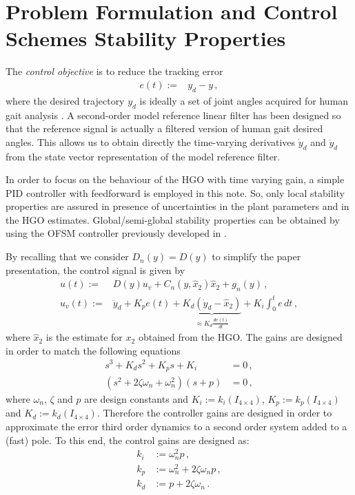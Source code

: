 \documentclass[letterpaper, 10 pt, conference]{ieeeconf}  %
\theoremstyle{plain}
\theoremstyle{definition}
\theoremstyle{remark}
\begin{document}
\section{Problem Formulation and Control Schemes Stability Properties}

The {\em control objective} is to reduce the tracking error 
%
\begin{align}
e(t) := & y_{d} - y\,,
\end{align}
%
where the desired trajectory $y_d$ is ideally a set of joint angles acquired for human gait analysis \cite{Schwartz2008}.  A second-order model reference linear filter%
%
%
has been designed so that the reference signal is actually a filtered version of human gait desired angles. This allows us to obtain directly the  time-varying derivatives $\dot{y}_d$ and $\ddot{y}_d$ from the state vector representation of the model reference filter.

In order to focus on the behaviour of the HGO with time varying gain, a simple  PID controller with feedforward is employed  in this note. So, only local stability properties are assured in presence of uncertainties in the plant parameters and in the HGO estimates. Global/semi-global stability properties can be obtained by using the  OFSM controller previously developed in \cite{POH:2011}.

By recalling that we  consider $D_n(y)=D(y)$ to simplify the paper presentation, the control  signal is given by
%
\begin{align}
u(t) := & D(y) u_v + C_{n}(y,\hat{x}_2) \hat{x}_2+g_{n}(y)\,, \\
u_v(t):= &\ddot{y}_d + K_p e(t) + \underbrace{K_d (\dot{y}_d - \hat{x}_2)}_{\approx K_d \frac{de(t)}{dt}} + K_i\int_{0}^{t}e \, dt\,,
\label{eq:defu}
\end{align}
%
where $\hat{x}_2$ is the estimate for $x_2$ obtained from the HGO. The gains are designed in order to match the following equations
%
\begin{align}
	s^3 + K_ds^2 + K_ps + K_i &= 0\,, \\
	(s^2 + 2\zeta \omega_n + \omega_n^2)(s + p) &= 0\,,
\end{align}
%
where $\omega_n$, $\zeta$ and $p$ are design constants and $K_i := k_i(I_{4 \times 4})$, $K_p := k_p(I_{4 \times 4})$ and $K_d := k_d(I_{4 \times 4})$. Therefore the controller gains are designed in order to approximate the error third order dynamics to a second order system added to a (fast) pole. To this end, the control gains are designed as:
%
\begin{align}
	k_i &:= \omega_n^2p\,, \\
	k_p &:= \omega_n^2 + 2\zeta \omega_n p\,, \\
	k_d &:= p + 2\zeta \omega_n\,. 
\end{align}
%
\end{document}
